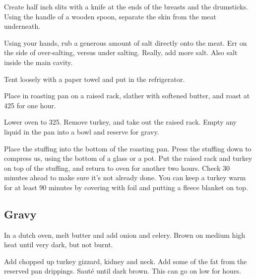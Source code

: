 \begin{recipe}
Create half inch slits with a knife at the ends of the breasts and the drumsticks.
Using the handle of a wooden spoon, separate the skin from the meat underneath.

Using your hands, rub a generous amount of salt directly onto the meat.
Err on the side of over-salting, versus under salting. Really, add more salt.
Also salt inside the main cavity.

Tent loosely with a paper towel and put in the refrigerator.

Place in roasting pan on a raised rack, slather with softened butter, and roast at 425\degree{} for one hour.

Lower oven to 325\degree{}. Remove turkey, and take out the raised rack.
Empty any liquid in the pan into a bowl and reserve for gravy.

Place the stuffing into the bottom of the roasting pan. Press the stuffing down to compress us, using the bottom of a glass or a pot. Put the raised rack
and turkey on top of the stuffing, and return to oven for another two hours. Check 30 minutes
ahead to make sure it's not already done. You can keep a turkey warm for at least 90 minutes by covering with foil and putting a fleece blanket on top. 

\newpage
\subsection{Gravy}



In a dutch oven, melt butter and add onion and celery. Brown on medium high heat until very dark, but not burnt.

Add chopped up turkey gizzard, kidney and neck. Add some of the fat from the reserved pan drippings. Sauté until dark brown. This can go on low for hours.



\end{recipe}
